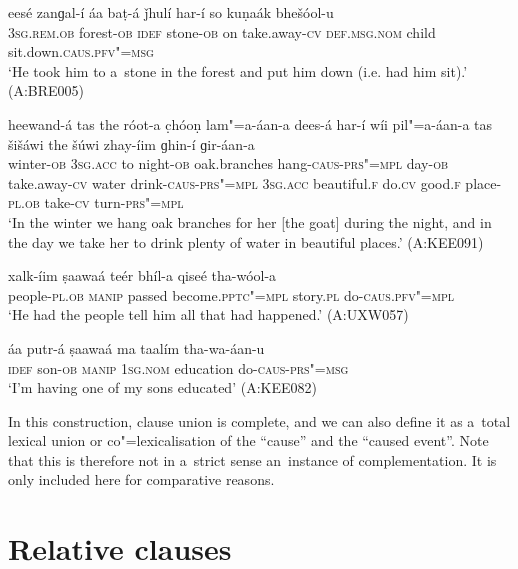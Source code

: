 \begin{exe}
\ex
\label{ex:13-184}
\gll eesé zanɡal-í áa baṭ-á ǰhulí har-í  so kuṇaák bhešóol-u \\
\textsc{3sg.rem.ob} forest-\textsc{ob} \textsc{idef} stone-\textsc{ob} on take.away-\textsc{cv} \textsc{def.msg.nom} child sit.down.\textsc{caus}.\textsc{pfv"=msg} \\
\glt `He took him to a~stone in the forest and put him down (i.e. had him sit).' (A:BRE005)

\ex
\label{ex:13-185}
\gll heewand-á tas the róot-a c̣hóoṇ  lam"=a-áan-a dees-á har-í wíi
pil"=a-áan-a tas šišáwi the šúwi zhay-íim  ɡhin-í ɡir-áan-a \\
winter-\textsc{ob}  \textsc{3sg.acc}  to night-\textsc{ob} oak.branches  hang-\textsc{caus}-\textsc{prs"=mpl} day-\textsc{ob} take.away-\textsc{cv} water  drink-\textsc{caus}-\textsc{prs"=mpl} \textsc{3sg.acc} beautiful.\textsc{f} do.\textsc{cv} good.\textsc{f} place-\textsc{pl.ob} take-\textsc{cv} turn-\textsc{prs"=mpl} \\
\glt `In the winter we hang oak branches for her [the goat] during the night, and in the day we take her to drink plenty of water in beautiful places.' (A:KEE091)

\ex
\label{ex:13-186}
\gll xalk-íim ṣaawaá teér bhíl-a qiseé  tha-wóol-a \\
people-\textsc{pl.ob} \textsc{manip} passed become.\textsc{pptc"=mpl} story.\textsc{pl} do-\textsc{caus}.\textsc{pfv"=mpl} \\
\glt `He had the people tell him all that had happened.' (A:UXW057)

\ex
\label{ex:13-187}
\gll áa putr-á ṣaawaá ma taalím tha-wa-áan-u  \\
\textsc{idef} son-\textsc{ob} \textsc{manip} \textsc{1sg.nom} education do-\textsc{caus}-\textsc{prs"=msg} \\
\glt `I'm having one of my sons educated' (A:KEE082) 
\end{exe}

In this construction, clause union is complete, and we can also define it as a~total lexical union \citep[86]{noonan2007} or co"=lexicalisation of the ``cause'' and the ``caused event''. Note that this is therefore not in a~strict sense an~instance of complementation. It is only included here for comparative reasons.


\section{Relative clauses}
\label{sec:13-6}

